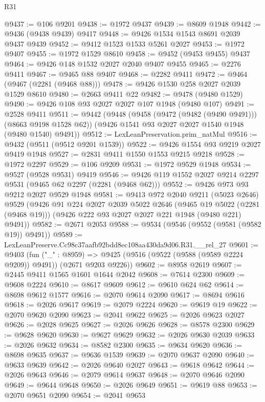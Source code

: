 \begin{lexlean}{R31}
\begin{coremodule}
@9437 := @106 @9201
@9438 := @1972 @9437
@9439 := @8609 @1948
@9442 := @9436 (@9438 @9439) @9417
@9448 := @9426 @1534 @1543 @8691 @2039 @9437 @9439
@9452 := @9412 @1523 @1533 @5261 @2027
@9453 := @1972 @9407
@9455 := @1972 @1529 @8610
@9458 := @9452 (@9453 @9455) @9437
@9464 := @9426 @148 @1532 @2027 @2040 @9407 @9455
@9465 := @2276 @9411
@9467 := @9465 @88 @9407
@9468 := @2282 @9411
@9472 := @9464 (@9467 (@2281 (@9468 @88)))
@9478 := @9426 @1530 @258 @2027 @2039 @1529 @8610
@9480 := @2663 @9411 @22
@9482 := @9478 (@9480 @1529)
@9490 := @9426 @108 @93 @2027 @2027 @107 @1948 (@9480 @107)
@9491 := @2528 @9411
@9511 := @9442
    (@9448
      (@9458 (@9472 (@9482 (@9490 @9491))) (@8663 @9198 @1528 @62))
      (@9426 @1541 @93 @2027 @2027 @1540 @1948 (@9480 @1540) @9491))
@9512 := LexLeanPreservation.prim_natMul
@9516 := @9432 (@9511 (@9512 @9201 @1539))
@9522 := @9426 @1554 @93 @9219 @2027 @9419 @1948
@9527 := @2831 @9411 @1550 @1553 @9215 @9218
@9528 := @1972 @2297
@9529 := @106 @9209
@9531 := @1972 @9529 @1948
@9534 := @9527 (@9528 @9531) @9419
@9546 := @9426 @119 @1552 @2027 @9214 @2297 @9531 (@9465 @62 @2297 (@2281 (@9468 @62)))
@9552 := @9426 @973 @93 @9212 @2027 @9529 @1948
@9581 := @9413
    @972
    @2040
    @9211
    (@5023 @2646)
    @9529
    (@9426
      @91
      @224
      @2027
      @2039
      @5022
      @2646
      (@9465 @19 @5022 (@2281 (@9468 @19)))
      (@9426 @222 @93 @2027 @2027 @221 @1948 (@9480 @221) @9491))
@9582 := @2671 @2053
@9588 := @9534 (@9546 (@9552 (@9581 (@9582 @19)) @9491))
@9589 := LexLeanPreserve.Cc98c37aafb92bdd8ec108aa430da9d06.R31.__rel_27
@9601 := @9403
    (fun ("_" : @8959) =>
    @9425 (@9516 (@9522 (@9588 (@9589 @2224 @9209)) @9491)) (@2671 @9203 @9226))
@9602 := @8958 @2619
@9607 := @2445 @9411 @1565 @1601 @1644 @2042
@9608 := @7614 @2300
@9609 := @9608 @2224
@9610 := @8617 @9609
@9612 := @9610 @624 @62
@9614 := @8698 @9612 @1577
@9616 := @2070 @9614 @2090
@9617 := @8694 @9616
@9618 := @2026 @9617
@9619 := @2079 @2224
@9620 := @9619 @19
@9622 := @2070 @9620 @2090
@9623 := @2041 @9622
@9625 := @2026 @9623 @2027
@9626 := @2028 @9625
@9627 := @2026 @9626
@9628 := @8578 @2300
@9629 := @9628 @9620
@9630 := @9627 @9629
@9632 := @2026 @9630 @2039
@9633 := @2026 @9632
@9634 := @8582 @2300
@9635 := @9634 @9620
@9636 := @8698 @9635
@9637 := @9636 @1539
@9639 := @2070 @9637 @2090
@9640 := @9633 @9639
@9642 := @2026 @9640 @2027
@9643 := @9618 @9642
@9644 := @2026 @9643
@9646 := @2079 @9614 @9637
@9648 := @2070 @9646 @2090
@9649 := @9644 @9648
@9650 := @2026 @9649
@9651 := @9619 @88
@9653 := @2070 @9651 @2090
@9654 := @2041 @9653

\end{coremodule}
\end{lexlean}
